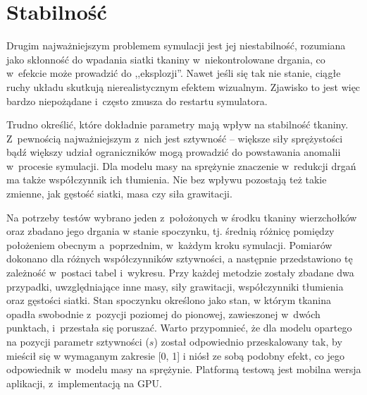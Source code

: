 		
		
		
		
		
		
	
	\section{Stabilność}
	\label{t:wyniki:stabilnosc}
	
		Drugim najważniejszym problemem symulacji jest jej niestabilność, rozumiana jako skłonność do wpadania siatki tkaniny w~niekontrolowane drgania, co w~efekcie może prowadzić do ,,eksplozji''. Nawet jeśli się tak nie stanie, ciągłe ruchy układu skutkują nierealistycznym efektem wizualnym. Zjawisko to jest więc bardzo niepożądane i~często zmusza do restartu symulatora.
		
		Trudno określić, które dokładnie parametry mają wpływ na stabilność tkaniny. Z~pewnością najważniejszym z~nich jest sztywność -- większe siły sprężystości bądź większy udział ograniczników mogą prowadzić do powstawania anomalii w~procesie symulacji. Dla modelu masy na sprężynie znaczenie w~redukcji drgań ma także współczynnik ich tłumienia. Nie bez wpływu pozostają też takie zmienne, jak gęstość siatki, masa czy siła grawitacji.
		
		Na potrzeby testów wybrano jeden z~położonych w środku tkaniny wierzchołków oraz zbadano jego drgania w stanie spoczynku, tj. średnią różnicę pomiędzy położeniem obecnym a~poprzednim, w~każdym kroku symulacji. Pomiarów dokonano dla różnych współczynników sztywności, a następnie przedstawiono tę zależność w~postaci tabel i~wykresu. Przy każdej metodzie zostały zbadane dwa przypadki, uwzględniające inne masy, siły grawitacji, współczynniki tłumienia oraz gęstości siatki. Stan spoczynku określono jako stan, w którym tkanina opadła swobodnie z~pozycji poziomej do pionowej, zawieszonej w~dwóch punktach, i~przestała się poruszać. Warto przypomnieć, że dla modelu opartego na pozycji parametr sztywności (\(s\)) został odpowiednio przeskalowany tak, by mieścił się w wymaganym zakresie [0, 1] i niósł ze sobą podobny efekt, co jego odpowiednik w~modelu masy na sprężynie. Platformą testową jest mobilna wersja aplikacji, z~implementacją na GPU.
		
